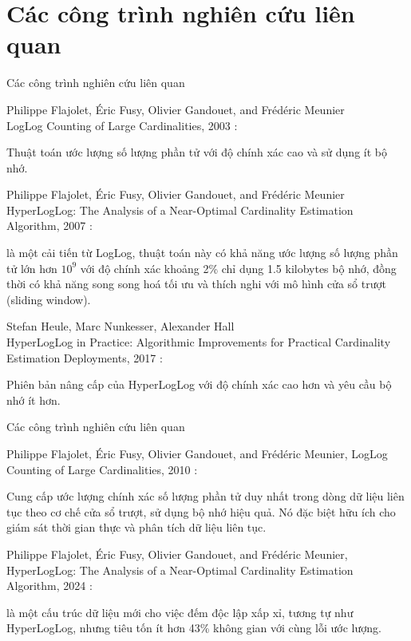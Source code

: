 \documentclass[10pt]{beamer}
\newcommand{\SubItem}[1]{
    {\setlength\itemindent{15pt} \item[-] #1}
}
\begin{document}
\section{Các công trình nghiên cứu liên quan}
\begin{frame}{Các công trình nghiên cứu liên quan}
\begin{itemize}
	\item Philippe Flajolet, Éric Fusy, Olivier Gandouet, and Frédéric Meunier\\ LogLog Counting of Large Cardinalities, 2003 \cite{durand2003loglog}: 
	\SubItem{Thuật toán ước lượng số lượng phần tử với độ chính xác cao và sử dụng ít bộ nhớ.}
	\item Philippe Flajolet, Éric Fusy, Olivier Gandouet, and Frédéric Meunier\\ HyperLogLog: The Analysis of a Near-Optimal Cardinality Estimation Algorithm, 2007 \cite{flajolet2007hyperloglog}: 
	\SubItem{là một cải tiến từ LogLog, thuật toán này có khả năng ước lượng số lượng phần tử lớn hơn $10^9$ với độ chính xác khoảng 2\% chỉ dụng 1.5 kilobytes bộ nhớ, đồng thời có khả năng song song hoá tối ưu và thích nghi với mô hình cửa sổ trượt (sliding window).}
	\item Stefan Heule, Marc Nunkesser, Alexander Hall\\ HyperLogLog in Practice: Algorithmic Improvements for Practical Cardinality Estimation Deployments, 2017 \cite{heule2013hyperloglog}: 
	\SubItem{Phiên bản nâng cấp của HyperLogLog với độ chính xác cao hơn và yêu cầu bộ nhớ ít hơn.}
\end{itemize}
\end{frame}
\begin{frame}{Các công trình nghiên cứu liên quan}
\begin{itemize}
	\item Philippe Flajolet, Éric Fusy, Olivier Gandouet, and Frédéric Meunier, LogLog Counting of Large Cardinalities, 2010 \cite{chabchoub2010sliding}: 
	\SubItem{Cung cấp ước lượng chính xác số lượng phần tử duy nhất trong dòng dữ liệu liên tục theo cơ chế cửa sổ trượt, sử dụng bộ nhớ hiệu quả. Nó đặc biệt hữu ích cho giám sát thời gian thực và phân tích dữ liệu liên tục.}
	\item Philippe Flajolet, Éric Fusy, Olivier Gandouet, and Frédéric Meunier, HyperLogLog: The Analysis of a Near-Optimal Cardinality Estimation Algorithm, 2024 \cite{ertl2024exaloglog}: 
	\SubItem{là một cấu trúc dữ liệu mới cho việc đếm độc lập xấp xỉ, tương tự như HyperLogLog, nhưng tiêu tốn ít hơn 43\% không gian với cùng lỗi ước lượng.}
\end{itemize}
\end{frame}
\end{document}
